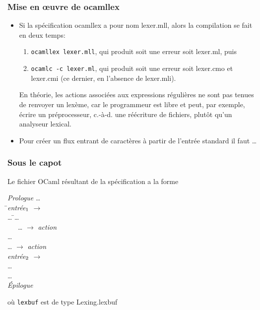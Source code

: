 %
\begin{frame}
\frametitle{Mise en {\oe}uvre de ocamllex}

\begin{itemize}

  \item Si la spécification \textsf{ocamllex} a pour nom
  \textsf{lexer.mll}, alors la compilation se fait en deux temps:

\begin{enumerate}

  \item \texttt{ocamllex lexer.mll}, qui produit soit une erreur soit
  \textsf{lexer.ml}, puis

  \item \texttt{ocamlc -c lexer.ml}, qui produit soit une erreur soit
  \textsf{lexer.cmo} et \textsf{lexer.cmi} (ce dernier, en l'absence de
  \textsf{lexer.mli}).

\end{enumerate}

En théorie, les actions associées aux expressions régulières ne sont
pas tenues de renvoyer un lexème, car le programmeur est libre et
peut, par exemple, écrire un préprocesseur, c.-à-d. une réécriture
de fichiers, plutôt qu'un analyseur lexical.

  \item Pour créer un flux entrant de caractères à partir de l'entrée
  standard il faut \Xlet {} \equal{}
   \lpar{}\rpar{} \Xin{} \ldots

\end{itemize}

\end{frame}

%
\begin{frame}
\frametitle{Sous le capot}

Le fichier OCaml résultant de la spécification a la forme
{\small
\begin{tabbing}
\emph{Prologue} \ldots\\
\Xlet \= \Xrec \emph{entrée}\(\sb{1}\) \equal \Xfun {}
\(\rightarrow\)\\
\> \ldots{} \= \Xmatch \ldots{} \Xwith\\
\>\> \ \ \ \ldots{} \(\rightarrow\) \emph{action}\\
\>\> \vbar{} \ldots{}\\
\>\> \vbar{} \ldots{} \(\rightarrow\) \emph{action}\\
\Xand \emph{entrée}\(\sb{2}\) \equal \Xfun {} \(\rightarrow\)\\
\> \ldots\\
\Xand \ldots\\
\emph{Épilogue}
\end{tabbing}
}
où \texttt{lexbuf} est de type \textsf{Lexing.lexbuf}

\end{frame}

